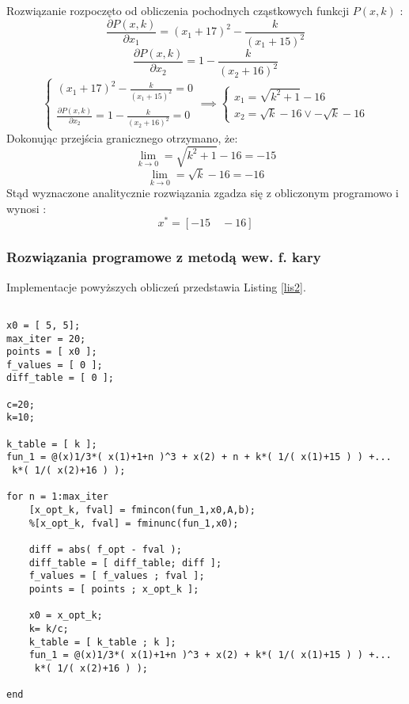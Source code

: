 \documentclass[a4paper,15pt]{article}
\begin{document}
Rozwiązanie rozpoczęto od obliczenia pochodnych cząstkowych funkcji \(P(x,k)\) : 
\begin{equation*}
\frac{\partial P(x,k)}{\partial x_{1}} = (x_{1}+17)^{2}-\frac{k}{(x_{1}+15)^{2}}
\end{equation*}
\begin{equation*}
\frac{\partial P(x,k)}{\partial x_{2}} = 1 - \frac{k}{(x_{2}+16)^{2}}
\end{equation*}
\begin{equation*}
\begin{cases}
(x_{1}+17)^{2}-\frac{k}{(x_{1}+15)^{2}} = 0 \\
\frac{\partial P(x,k)}{\partial x_{2}} = 1 - \frac{k}{(x_{2}+16)^{2}} = 0 
\end{cases}
\implies
\begin{cases}
x_{1} = \sqrt{k^{2}+1}-16 \\
x_{2} = \sqrt{k}-16 \vee -\sqrt{k}-16
\end{cases}
\end{equation*}
Dokonując przejścia granicznego otrzymano, że:
\begin{equation*}
\lim_{k \rightarrow 0 }  = \sqrt{k^{2}+1}-16 = -15
\end{equation*}
\begin{equation*}
\lim_{k \rightarrow 0 }  = \sqrt{k}-16 = -16
\end{equation*}
Stąd wyznaczone analitycznie rozwiązania zgadza się z obliczonym programowo i wynosi : \\
\begin{equation*}
x^{*} = [ -15 \quad -16 ]
\end{equation*}

\subsubsection{Rozwiązania programowe z metodą wew. f. kary}
Implementacje powyższych obliczeń przedstawia Listing \ref{lis2}.
\begin{lstlisting}[caption=Znalezienie minimum przy użyciu wewnętrznej funkcji kary, captionpos=b,label=lis2, firstnumber=12,frame=single]
% znalezienie minimum przy uzyciu wewnetrznej f. kary

x0 = [ 5, 5]; 
max_iter = 20;
points = [ x0 ];
f_values = [ 0 ];
diff_table = [ 0 ];

c=20;
k=10;

k_table = [ k ];
fun_1 = @(x)1/3*( x(1)+1+n )^3 + x(2) + n + k*( 1/( x(1)+15 ) ) +...
 k*( 1/( x(2)+16 ) );

for n = 1:max_iter
    [x_opt_k, fval] = fmincon(fun_1,x0,A,b);
    %[x_opt_k, fval] = fminunc(fun_1,x0);
    
    diff = abs( f_opt - fval );
    diff_table = [ diff_table; diff ];
    f_values = [ f_values ; fval ];  
    points = [ points ; x_opt_k ];
    
    x0 = x_opt_k;
    k= k/c;
    k_table = [ k_table ; k ];
    fun_1 = @(x)1/3*( x(1)+1+n )^3 + x(2) + k*( 1/( x(1)+15 ) ) +...
     k*( 1/( x(2)+16 ) );

end

\end{lstlisting}
\end{document}
